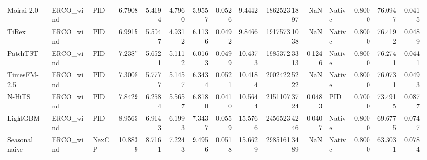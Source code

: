 \begin{tabular}{lllrrrrrrrrlrrr}
Moirai-2.0 & ERCO_wind & PID & 6.7908 & 5.4194 & 4.7960 & 5.9557 & 0.0526 & 9.4442 & 1862523.1897 & NaN & Native & 0.8000 & 76.0947 & 0.0415 \\
TiRex & ERCO_wind & PID & 6.9915 & 5.5047 & 4.9312 & 6.1136 & 0.0492 & 9.8466 & 1917573.1038 & NaN & Native & 0.8000 & 76.4192 & 0.0489 \\
PatchTST & ERCO_wind & PID & 7.2387 & 5.6521 & 5.1112 & 6.0163 & 0.0499 & 10.4373 & 1985372.3313 & 0.1246 & Native & 0.8000 & 76.2741 & 0.0441 \\
TimesFM-2.5 & ERCO_wind & PID & 7.3008 & 5.7777 & 5.1457 & 6.3434 & 0.0521 & 10.4184 & 2002422.5222 & NaN & Native & 0.8000 & 76.0731 & 0.0493 \\
N-HiTS & ERCO_wind & PID & 7.8429 & 6.2684 & 5.5657 & 6.8180 & 0.0410 & 10.5644 & 2151107.3724 & 0.0483 & PID & 0.7000 & 73.4915 & 0.0877 \\
LightGBM & ERCO_wind & PID & 8.9565 & 6.9143 & 6.1993 & 7.3437 & 0.0559 & 15.5766 & 2456523.4246 & 0.0407 & Native & 0.8000 & 69.6775 & 0.0747 \\
Seasonal naive & ERCO_wind & NexCP & 10.8839 & 8.7161 & 7.2243 & 9.4956 & 0.0518 & 15.6629 & 2985161.3489 & NaN & Native & 0.8000 & 63.3031 & 0.0784 \\
\bottomrule
\end{tabular}
